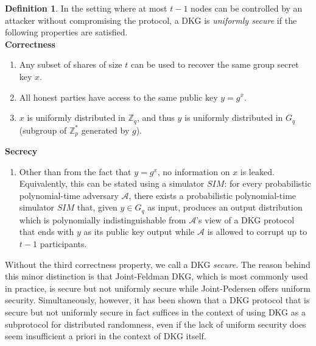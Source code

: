 \documentclass[11pt]{article}
\theoremstyle{definition}
\newtheorem{definition}[theorem]{Definition}
\theoremstyle{remark}
\begin{document}
\begin{definition}
In the setting where at most $t - 1$ nodes can be controlled by an attacker without compromising the protocol, a DKG is \textit{uniformly secure} if the following properties are satisfied.\\

\textbf{Correctness}
\begin{enumerate}
\item Any subset of shares of size $t$ can be used to recover the same group secret key $x$.
\item All honest parties have access to the same public key $y = g^x$.
\item $x$ is uniformly distributed in $\mathbb{Z}_q$, and thus $y$ is uniformly distributed in $G_q$ (subgroup of $\mathbb{Z}^*_p$ generated by $g$).
\end{enumerate}

\textbf{Secrecy}
\begin{enumerate}
\item Other than from the fact that $y = g^x$, no information on $x$ is leaked. Equivalently, this can be stated using a simulator $SIM$: for every probabilistic polynomial-time adversary $\mathcal{A}$, there exists a probabilistic polynomial-time simulator $SIM$ that, given $y \in G_q$ as input, produces an output distribution which is polynomially indistinguishable from $\mathcal{A}$'s view of a DKG protocol that ends with $y$ as its public key output while $\mathcal{A}$ is allowed to corrupt up to $t - 1$ participants.
\end{enumerate}
\end{definition}

Without the third correctness property, we call a DKG \textit{secure}. The reason behind this minor distinction is that Joint-Feldman DKG, which is most commonly used in practice, is secure but not uniformly secure while Joint-Pedersen offers uniform security. Simultaneously, however, it has been shown that a DKG protocol that is secure but not uniformly secure in fact suffices in the context of using DKG as a subprotocol for distributed randomness, even if the lack of uniform security does seem insufficient a priori in the context of DKG itself.

\end{document}
